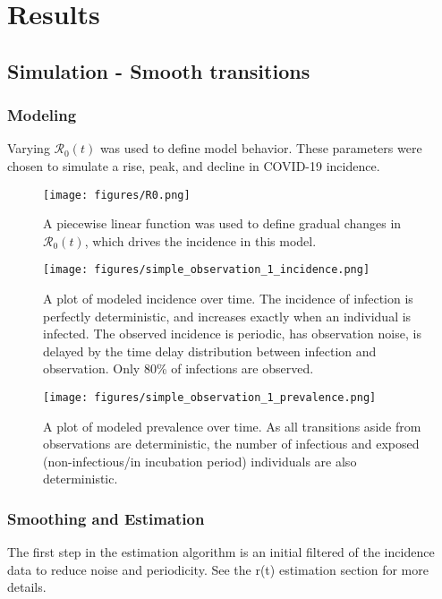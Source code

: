 \documentclass{article}
\newcommand{\nR}{\mathcal{R}}
\begin{document}
\section{Results}

\subsection{Simulation - Smooth transitions}
\subsubsection{Modeling}

Varying $\nR_0(t)$ was used to define model behavior. These parameters were chosen to simulate a rise, peak, and decline in COVID-19 incidence.

\begin{figure}[h!]
\centering
\texttt{[image: figures/R0.png]}
\caption{A piecewise linear function was used to define gradual changes in $\nR_0(t)$, which drives the incidence in this model.}

\end{figure}

\clearpage
\begin{figure}[h!]
\centering
\texttt{[image: figures/simple\_observation\_1\_incidence.png]}
\caption{A plot of modeled incidence over time. The incidence of infection is perfectly deterministic, and increases exactly when an individual is infected. The observed incidence is periodic, has observation noise, is delayed by the time delay distribution between infection and observation. Only 80\% of infections are observed.}
\end{figure}

\begin{figure}[h!]
\centering
\texttt{[image: figures/simple\_observation\_1\_prevalence.png]}
\caption{A plot of modeled prevalence over time. As all transitions aside from observations are deterministic, the number of infectious and exposed (non-infectious/in incubation period) individuals are also deterministic.}
\end{figure}

\subsubsection{Smoothing and Estimation}

The first step in the estimation algorithm is an initial filtered of the incidence data to reduce noise and periodicity. See the r(t) estimation section for more details.
\end{document}
